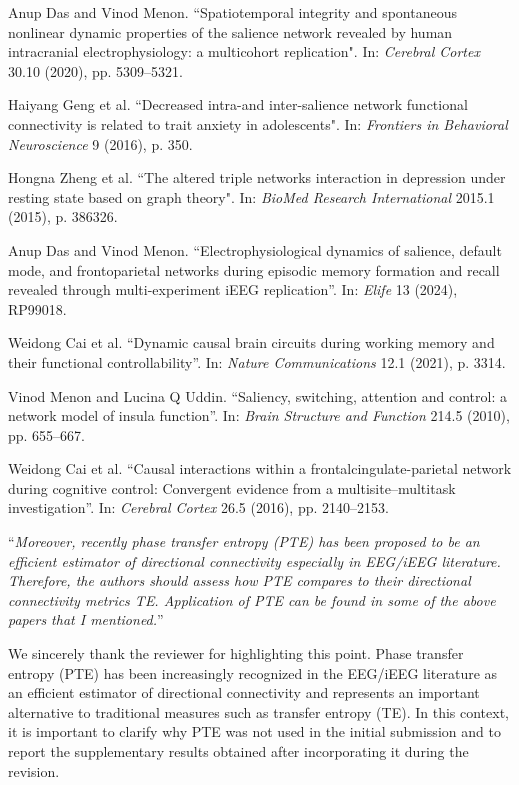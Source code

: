 \documentclass[12pt,technote,onecolumn]{IEEEtran}
\begin{document}
\noindent[47]\:Anup Das and Vinod Menon. ``Spatiotemporal integrity and spontaneous nonlinear dynamic properties of the salience network revealed by human intracranial electrophysiology: a multicohort replication". In: \textit{Cerebral Cortex} 30.10 (2020), pp. 5309–5321.

\noindent[80]\:Haiyang Geng et al. ``Decreased intra-and inter-salience network functional connectivity is related to trait anxiety in adolescents". In: \textit{Frontiers in Behavioral Neuroscience} 9 (2016), p. 350.

\noindent[81]\:Hongna Zheng et al. ``The altered triple networks interaction in depression under resting state based on graph theory". In: \textit{BioMed Research International} 2015.1 (2015), p. 386326.

\noindent[82]\:Anup Das and Vinod Menon. ``Electrophysiological dynamics of salience, default mode, and frontoparietal networks during episodic memory formation and recall revealed through multi-experiment iEEG replication”. In: \textit{Elife} 13 (2024), RP99018.

\noindent[83]\:Weidong Cai et al. ``Dynamic causal brain circuits during working memory and their functional controllability”. In: \textit{Nature Communications} 12.1 (2021), p. 3314.

\noindent[84]\:Vinod Menon and Lucina Q Uddin. ``Saliency, switching, attention and control: a network model of insula function”. In: \textit{Brain Structure and Function} 214.5 (2010), pp. 655–667.

\noindent[85]\:Weidong Cai et al. ``Causal interactions within a frontalcingulate-parietal network during cognitive control: Convergent evidence from a multisite–multitask investigation”. In: \textit{Cerebral Cortex} 26.5 (2016), pp. 2140–2153.


\vspace{4mm}


 ``{\it Moreover, recently phase transfer entropy (PTE) has been proposed to be an efficient estimator of directional connectivity especially in EEG/iEEG literature. Therefore, the authors should assess how PTE compares to their directional connectivity metrics TE. Application of PTE can be found in some of the above papers that I mentioned.}''
\vspace{1mm}


We sincerely thank the reviewer for highlighting this point. Phase transfer entropy (PTE) has been increasingly recognized in the EEG/iEEG literature as an efficient estimator of directional connectivity and represents an important alternative to traditional measures such as transfer entropy (TE). In this context, it is important to clarify why PTE was not used in the initial submission and to report the supplementary results obtained after incorporating it during the revision.
\end{document}

